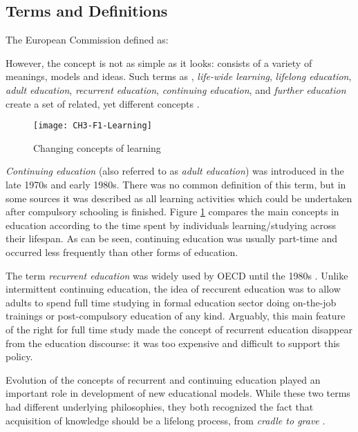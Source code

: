 \subsection{Terms and Definitions}

The European Commission \citeyearpar{EuropeanCommission2000} defined \LLLs as:


However, the concept is not as simple as it looks: \LLLs consists of a variety
of meanings, models and ideas. Such terms as \textit{\LLLsn}, \textit{life-wide
learning}, \textit{lifelong education}, \textit{adult education},
\textit{recurrent education}, \textit{continuing education}, and \textit{further
education} create a set of related, yet different concepts \citep{Hager2011}.

\begin{figure}[htb]
\centering
\texttt{[image: CH3-F1-Learning]}
\caption[Changing concepts of learning]{Changing concepts of learning 
\citep{Jarvis2004}}
\label{fig:learning}
\end{figure}

\textit{Continuing education} (also referred to as \textit{adult education}) was
introduced in the late 1970s and early 1980s. There was no common definition of
this term, but in some sources  \citep{Jarvis2004} it was described as all
learning activities which could be undertaken after compulsory schooling is
finished. Figure \ref{fig:learning} compares the main concepts in education
according to the time spent by individuals learning/studying across their
lifespan. As can be seen, continuing education was usually part-time and
occurred less frequently than other forms of education.

\FloatBarrier
The term \textit{recurrent education} was widely used by OECD until the 1980s
\citep{Jarvis2004}. Unlike intermittent continuing education, the idea of
reccurent education was to allow adults to spend full time studying in
formal education sector doing on-the-job trainings or post-compulsory education
of any kind. Arguably, this main feature of the right for full time study made
the concept of recurrent education disappear from the education discourse: it
was too expensive and difficult to support this policy.

Evolution of the concepts of recurrent and continuing education played an
important role in development of new educational models. While these two terms
had different underlying philosophies, they both recognized the fact that
acquisition of knowledge should be a lifelong process, from \textit{cradle to
grave} \citep{Hargreaves2004}.

